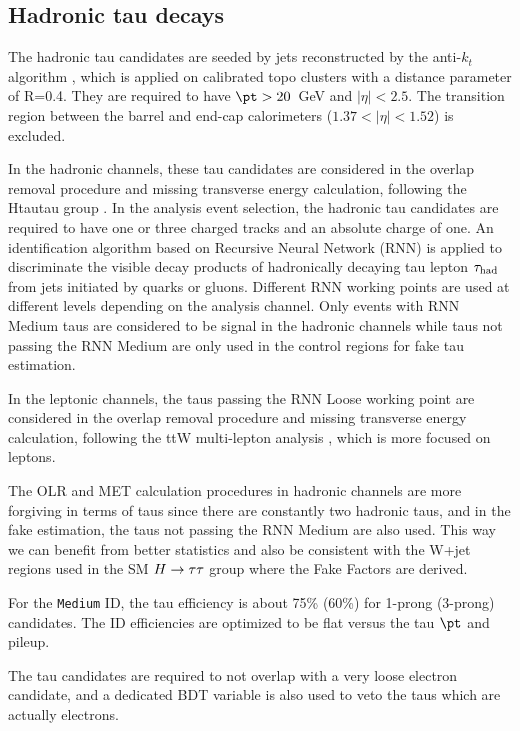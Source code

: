 \subsection{Hadronic tau decays}
\label{sec:taurecon}
The hadronic tau candidates \cite{tau_sys1} are seeded by jets reconstructed by the anti-$k_t$ algorithm \cite{antikt}, which is applied on calibrated topo clusters \cite{topocluster} with a distance parameter of R=0.4. They are required to have $\pt > 20$~GeV and $|\eta|<2.5$. The transition region between the barrel and end-cap calorimeters ($1.37<|\eta|<1.52$) is excluded.

In the hadronic channels, these tau candidates are considered in the overlap removal procedure and missing transverse energy calculation, following the Htautau group \cite{Htautau-note}. In the analysis event selection, the hadronic tau candidates are required to have one or three charged tracks and an absolute charge of one. An identification algorithm based on Recursive Neural Network (RNN) \cite{tau_sys2} is applied to discriminate the visible decay products of hadronically decaying tau lepton $\tau_\text{had}$ from jets initiated by quarks or gluons. Different RNN working points are used at different levels depending on the analysis channel. Only events with RNN Medium taus are considered to be signal in the hadronic channels while taus not passing the RNN Medium are only used in the control regions for fake tau estimation.

In the leptonic channels, the taus passing the RNN Loose working point are considered in the overlap removal procedure and missing transverse energy calculation, following the ttW multi-lepton analysis \cite{ttHMLgroup}, which is more focused on leptons.

The OLR and MET calculation procedures in hadronic channels are more forgiving in terms of taus since there are constantly two hadronic taus, and in the fake estimation, the taus not passing the RNN Medium are also used. This way we can benefit from better statistics and also be consistent with the W+jet regions used in the SM $H \rightarrow \tau\tau$ group where the Fake Factors are derived.

For the \texttt{Medium} ID, the tau efficiency is about 75\% (60\%) for 1-prong (3-prong) candidates. The ID efficiencies are optimized to be flat versus the tau $\pt$ and pileup.

The tau candidates are required to not overlap with a very loose electron candidate, and a dedicated BDT variable is also used to veto the taus which are actually electrons.

